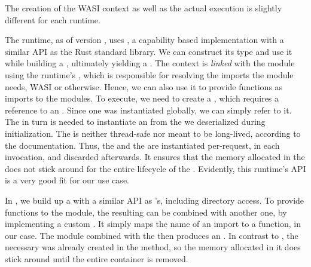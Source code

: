 The creation of the WASI context as well as the actual execution is slightly different for each runtime.


\begin{description}[style=multiline, leftmargin=2.5cm, font=\bfseries]

    \item[Wasmtime] The  runtime, as of version , uses , a capability based implementation with a similar API as the Rust standard library. We can construct its  type and use it while building a , ultimately yielding a . The context is \emph{linked} with the module using the runtime's , which is responsible for resolving the imports the module needs, WASI or otherwise. Hence, we can also use it to provide functions as imports to the modules.
    To execute, we need to create a , which requires a reference to an . Since one was instantiated globally, we can simply refer to it. The  in turn is needed to instantiate an  from the  we deserialized during initialization. The  is neither thread-safe nor meant to be long-lived, according to the documentation. Thus, the  and the  are instantiated per-request, in each  invocation, and discarded afterwards. It ensures that the memory allocated in the  does not stick around for the entire lifecycle of the . Evidently, this runtime's API is a very good fit for our use case.

    \item[Wasmer] In , we build up a  with a similar API as 's, including directory access. To provide functions to the module, the resulting  can be combined with another one, by implementing a custom . It simply maps the name of an import to a function, in our case. The module combined with the  then produces an . In contrast to , the necessary  was already created in the  method, so the memory allocated in it does stick around until the entire container is removed.


\end{description}
